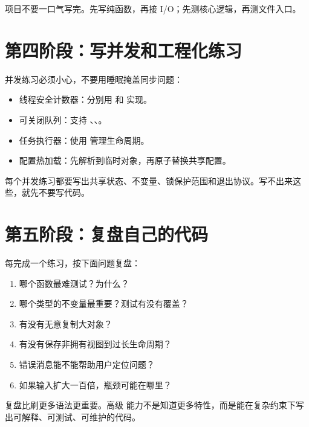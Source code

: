 项目不要一口气写完。先写纯函数，再接 I/O；先测核心逻辑，再测文件入口。

\section{第四阶段：写并发和工程化练习}

并发练习必须小心，不要用睡眠掩盖同步问题：

\begin{itemize}
  \item 线程安全计数器：分别用  和  实现。
  \item 可关闭队列：支持 、、。
  \item 任务执行器：使用  管理生命周期。
  \item 配置热加载：先解析到临时对象，再原子替换共享配置。
\end{itemize}

每个并发练习都要写出共享状态、不变量、锁保护范围和退出协议。写不出来这些，就先不要写代码。

\section{第五阶段：复盘自己的代码}

每完成一个练习，按下面问题复盘：

\begin{enumerate}
  \item 哪个函数最难测试？为什么？
  \item 哪个类型的不变量最重要？测试有没有覆盖？
  \item 有没有无意复制大对象？
  \item 有没有保存非拥有视图到过长生命周期？
  \item 错误消息能不能帮助用户定位问题？
  \item 如果输入扩大一百倍，瓶颈可能在哪里？
\end{enumerate}

复盘比刷更多语法更重要。高级 \cpp 能力不是知道更多特性，而是能在复杂约束下写出可解释、可测试、可维护的代码。
